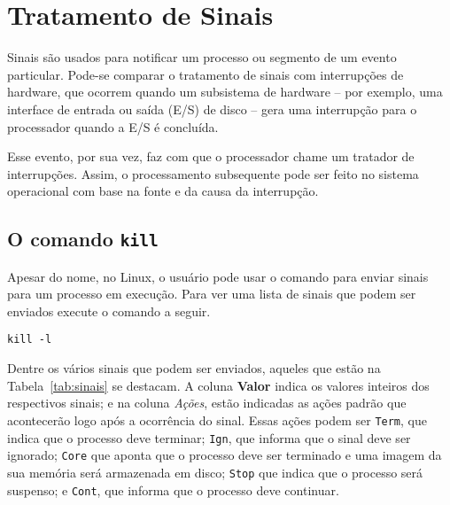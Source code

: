 \chapter{Tratamento de Sinais}

Sinais são usados para notificar um processo ou segmento de um evento particular. Pode-se comparar o tratamento de sinais com interrupções de hardware, que ocorrem quando um subsistema de hardware -- por exemplo, uma interface de entrada ou saída (E/S) de disco -- gera uma interrupção para o processador quando a E/S é concluída.

Esse evento, por sua vez, faz com que o processador chame um tratador de interrupções. Assim, o processamento subsequente pode ser feito no sistema operacional com base na fonte e da causa da interrupção.

\section{O comando \texttt{kill}}
Apesar do nome, no Linux, o usuário pode usar o comando  para enviar sinais para um processo em execução. Para ver uma lista de sinais que podem ser enviados execute o comando a seguir.

\begin{lstlisting}[style=MyBashStyle]
kill -l
\end{lstlisting}

Dentre os vários sinais que podem ser enviados, aqueles que estão na Tabela~\ref{tab:sinais} se destacam. A coluna \textbf{Valor} indica os valores inteiros dos respectivos sinais; e na coluna \textit{Ações}, estão indicadas as ações padrão que acontecerão logo após a ocorrência do sinal. Essas ações podem ser \texttt{Term}, que indica que o processo deve terminar; \texttt{Ign}, que informa que o sinal deve ser ignorado; \texttt{Core} que aponta que o processo deve ser terminado e uma imagem da sua memória será armazenada em disco; \texttt{Stop} que indica que o processo será suspenso; e \texttt{Cont}, que informa que o processo deve continuar.

\newpage

